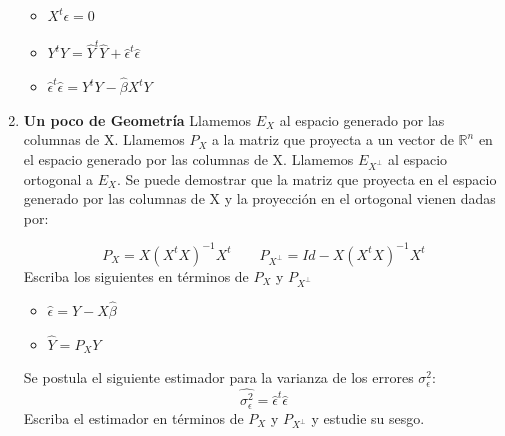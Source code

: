 \begin{enumerate}
\begin{itemize}
    \item $X^t\epsilon=0$
    \item $Y^tY=\hat{Y}^t\hat{Y}+\hat{\epsilon}^t\hat{\epsilon}$
    \item $\hat{\epsilon}^t\hat{\epsilon}=Y^tY-\hat{\beta}X^tY$
\end{itemize}

\item \textbf{Un poco de Geometría}
Llamemos $E_X$ al espacio generado por las columnas de X. Llamemos $P_X$ a la matriz que proyecta a un vector de $\mathbb{R}^n$ en el espacio generado por las columnas de X. Llamemos $E_{X^{\perp}}$ al espacio ortogonal a $E_X$. Se puede demostrar que la matriz que proyecta en el espacio generado por las columnas de X y la proyección en el ortogonal vienen dadas por:

\[P_X=X(X^tX)^{-1}X^t  \qquad P_{X^{\perp}}=Id- X(X^tX)^{-1}X^t  \]
Escriba los siguientes en términos de $P_X$ y $P_{X^{\perp}}$
\begin{itemize}
    \item $\hat{\epsilon}=Y-X\hat{\beta}$
    \item $\hat{Y}=P_X Y$
\end{itemize}
Se postula el siguiente estimador para la varianza de los errores $\sigma^2_\epsilon$:
\[\hat{\sigma_\epsilon^2}=\hat{\epsilon}^t\hat{\epsilon}\]
Escriba el estimador en términos de $P_X$ y $P_{X^{\perp}}$ y estudie su sesgo.
\end{enumerate}


